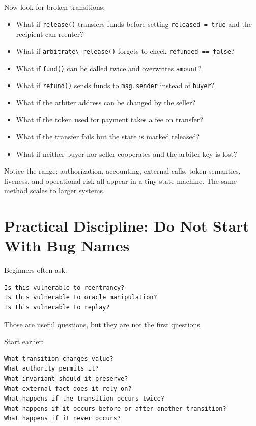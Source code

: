 Now look for broken transitions:

\begin{itemize}
\tightlist
\item
  What if \passthrough{\lstinline!release()!} transfers funds before
  setting \passthrough{\lstinline!released = true!} and the recipient
  can reenter?
\item
  What if \passthrough{\lstinline!arbitrate\_release()!} forgets to
  check \passthrough{\lstinline!refunded == false!}?
\item
  What if \passthrough{\lstinline!fund()!} can be called twice and
  overwrites \passthrough{\lstinline!amount!}?
\item
  What if \passthrough{\lstinline!refund()!} sends funds to
  \passthrough{\lstinline!msg.sender!} instead of
  \passthrough{\lstinline!buyer!}?
\item
  What if the arbiter address can be changed by the seller?
\item
  What if the token used for payment takes a fee on transfer?
\item
  What if the transfer fails but the state is marked released?
\item
  What if neither buyer nor seller cooperates and the arbiter key is
  lost?
\end{itemize}

Notice the range: authorization, accounting, external calls, token
semantics, liveness, and operational risk all appear in a tiny state
machine. The same method scales to larger systems.

\section{Practical Discipline: Do Not Start With Bug Names}

Beginners often ask:

\begin{lstlisting}
Is this vulnerable to reentrancy?
Is this vulnerable to oracle manipulation?
Is this vulnerable to replay?
\end{lstlisting}

Those are useful questions, but they are not the first questions.

Start earlier:

\begin{lstlisting}
What transition changes value?
What authority permits it?
What invariant should it preserve?
What external fact does it rely on?
What happens if the transition occurs twice?
What happens if it occurs before or after another transition?
What happens if it never occurs?
\end{lstlisting}


